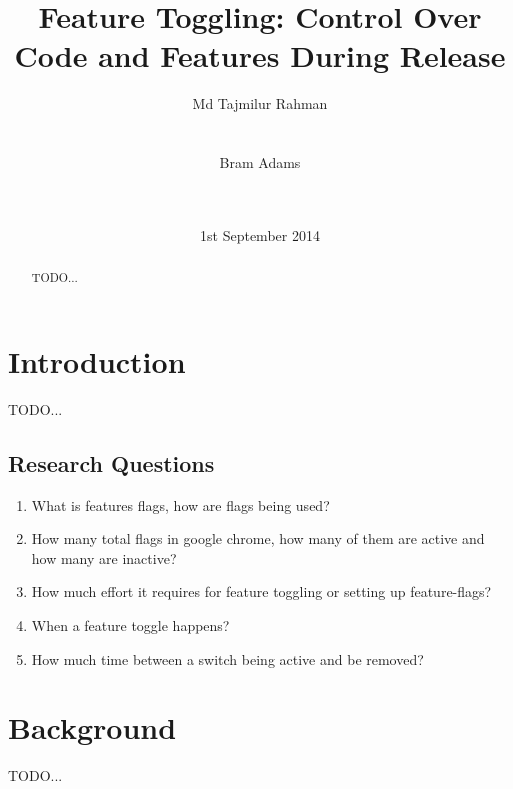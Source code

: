 \documentclass{acm_proc_article-sp}
\begin{document}
\title{Feature Toggling: Control Over Code and Features During Release}
\author{
\alignauthor
Md Tajmilur Rahman\\
       \\
       \\
\alignauthor
Bram Adams\\
       \\
       \\
}
\date{1st September 2014}
\maketitle

\begin{abstract}
TODO...
\end{abstract}

\section{Introduction}
TODO...

\subsection{Research Questions}

\renewcommand{\labelenumi}{RQ\theenumi:}
\begin{enumerate}
\item What is features flags, how are flags being used? \newline
\item How many total flags in google chrome, how many of them are active and how many are inactive? \newline
\item How much effort it requires for feature toggling or setting up feature-flags? \newline
\item When a feature toggle happens?\newline
\item How much time between a switch being active and be removed?\newline
\end{enumerate}

\section{Background}
TODO...
\end{document}
